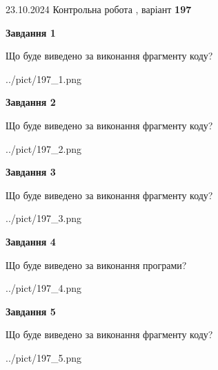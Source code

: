 \documentclass[12pt, ukrainian]{article}
\begin{document}
{\Large{23.10.2024 Контрольна робота , варіант  \No \textbf { 197 }\par}}
{
\begin {large}
{\begin {center}\textbf{Завдання 1}\end {center}}

Що буде виведено за виконання фрагменту коду?\par
\begin{center}
	{../pict/197_1.png}
\end{center}
\newpage

{\begin {center}\textbf{Завдання 2}\end {center}}

Що буде виведено за виконання фрагменту коду?\par
\begin{center}
	{../pict/197_2.png}
\end{center}
\newpage

{\begin {center}\textbf{Завдання 3}\end {center}}

Що буде виведено за виконання фрагменту коду?\par
\begin{center}
	{../pict/197_3.png}
\end{center}
\newpage

{\begin {center}\textbf{Завдання 4}\end {center}}

Що буде виведено за виконання програми?\par
\begin{center}
	{../pict/197_4.png}
\end{center}
\newpage

{\begin {center}\textbf{Завдання 5}\end {center}}

Що буде виведено за виконання фрагменту коду?\par
\begin{center}
	{../pict/197_5.png}
\end{center}
\newpage


\end{large}}
\end{document}
